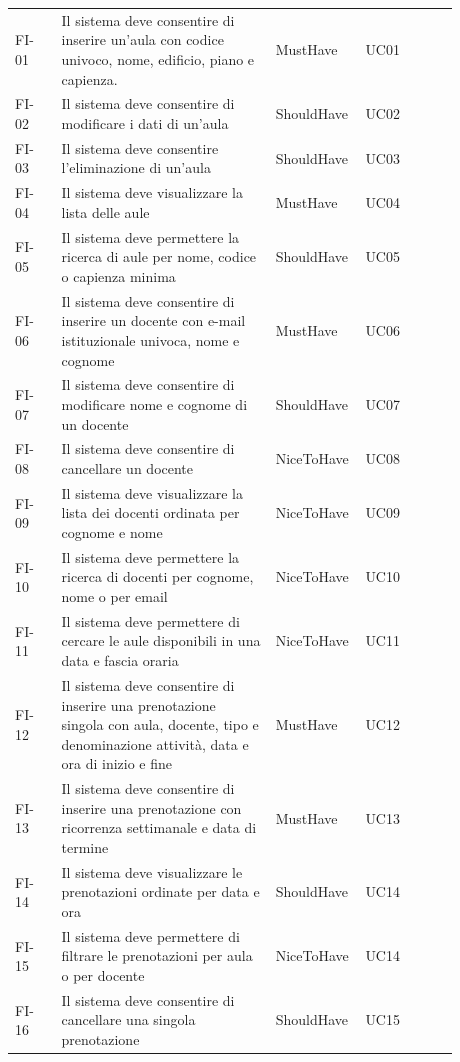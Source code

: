 \documentclass[a4paper,11pt]{article}
\begin{document}
{\begin{longtable}{@{}H{0.10\linewidth} P{0.46\linewidth} P{0.12\linewidth} P{0.20\linewidth}@{}}
FI-01 & Il sistema deve consentire di inserire un'aula con codice univoco, nome, edificio, piano e capienza. & MustHave &\mbox{UC01} \\
FI-02 & Il sistema deve consentire di modificare i dati di un'aula & ShouldHave &\mbox{UC02} \\
FI-03 & Il sistema deve consentire l'eliminazione di un'aula & ShouldHave &\mbox{UC03} \\
FI-04 & Il sistema deve visualizzare la lista delle aule & MustHave &\mbox{UC04} \\
FI-05 & Il sistema deve permettere la ricerca di aule per nome, codice o capienza minima & ShouldHave &\mbox{UC05} \\
FI-06 & Il sistema deve consentire di inserire un docente con e-mail istituzionale univoca, nome e cognome & MustHave &\mbox{UC06} \\
FI-07 & Il sistema deve consentire di modificare nome e cognome di un docente & ShouldHave &\mbox{UC07} \\
FI-08 & Il sistema deve consentire di cancellare un docente & NiceToHave &\mbox{UC08} \\
FI-09 & Il sistema deve visualizzare la lista dei docenti ordinata per cognome e nome & NiceToHave &\mbox{UC09} \\
FI-10 & Il sistema deve permettere la ricerca di docenti per cognome, nome o per email & NiceToHave &\mbox{UC10} \\
FI-11 & Il sistema deve permettere di cercare le aule disponibili in una data e fascia oraria & NiceToHave &\mbox{UC11} \\
FI-12 & Il sistema deve consentire di inserire una prenotazione singola con aula, docente, tipo e denominazione attività, data e ora di inizio e fine & MustHave &\mbox{UC12} \\
FI-13 & Il sistema deve consentire di inserire una prenotazione con ricorrenza settimanale e data di termine & MustHave &\mbox{UC13} \\
FI-14 & Il sistema deve visualizzare le prenotazioni ordinate per data e ora & ShouldHave &\mbox{UC14} \\
FI-15 & Il sistema deve permettere di filtrare le prenotazioni per aula o per docente & NiceToHave &\mbox{UC14} \\
FI-16 & Il sistema deve consentire di cancellare una singola prenotazione & ShouldHave &\mbox{UC15} \\

\end{longtable}}
\end{document}
